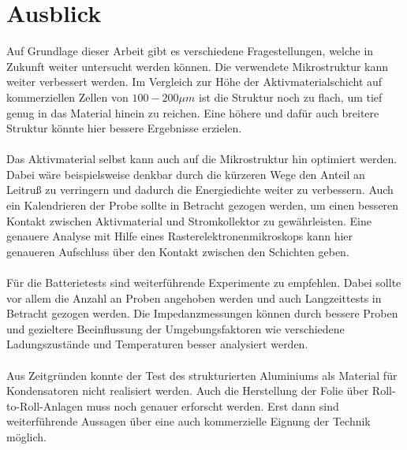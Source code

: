 \documentclass[a4paper, 11pt, headsepline,footsepline,twoside,abstract]{scrbook}
\begin{document}
\section{Ausblick}
Auf Grundlage dieser Arbeit gibt es verschiedene Fragestellungen, welche in Zukunft weiter untersucht werden können. Die verwendete Mikrostruktur kann weiter verbessert werden. Im Vergleich zur Höhe der Aktivmaterialschicht auf kommerziellen Zellen von $100 - 200\mu m$ ist die Struktur noch zu flach, um tief genug in das Material hinein zu reichen. Eine höhere und dafür auch breitere Struktur könnte hier bessere Ergebnisse erzielen.
\\\\
Das Aktivmaterial selbst kann auch auf die Mikrostruktur hin optimiert werden. Dabei wäre beispielsweise denkbar durch die kürzeren Wege den Anteil an Leitruß zu verringern und dadurch die Energiedichte weiter zu verbessern. Auch ein Kalendrieren der Probe sollte in Betracht gezogen werden, um einen besseren Kontakt zwischen Aktivmaterial und Stromkollektor zu gewährleisten. Eine genauere Analyse mit Hilfe eines Rasterelektronenmikroskops kann hier genaueren Aufschluss über den Kontakt zwischen den Schichten geben.
\\\\
Für die Batterietests sind weiterführende Experimente zu empfehlen. Dabei sollte vor allem die Anzahl an Proben angehoben werden und auch Langzeittests in Betracht gezogen werden. Die Impedanzmessungen können durch bessere Proben und gezieltere Beeinflussung der Umgebungsfaktoren wie verschiedene Ladungszustände und Temperaturen besser analysiert werden.
\\\\
Aus Zeitgründen konnte der Test des strukturierten Aluminiums als Material für Kondensatoren nicht realisiert werden. Auch die Herstellung der Folie über Roll-to-Roll-Anlagen muss noch genauer erforscht werden. Erst dann sind weiterführende Aussagen über eine auch kommerzielle Eignung der Technik möglich.
\renewcommand{\thesection}{\Alph{section}}

\cleardoublepage
{}
\listoffigures

\cleardoublepage
{}

 

\end{document}
